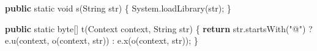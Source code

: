 \documentclass[
]{article}
\newenvironment{Shaded}{}{}
\newcommand{\BuiltInTok}[1]{\textcolor[rgb]{0.00,0.50,0.00}{#1}}
\newcommand{\ControlFlowTok}[1]{\textcolor[rgb]{0.00,0.44,0.13}{\textbf{#1}}}
\newcommand{\DataTypeTok}[1]{\textcolor[rgb]{0.56,0.13,0.00}{#1}}
\newcommand{\FunctionTok}[1]{\textcolor[rgb]{0.02,0.16,0.49}{#1}}
\newcommand{\KeywordTok}[1]{\textcolor[rgb]{0.00,0.44,0.13}{\textbf{#1}}}
\newcommand{\NormalTok}[1]{#1}
\newcommand{\OperatorTok}[1]{\textcolor[rgb]{0.40,0.40,0.40}{#1}}
\newcommand{\StringTok}[1]{\textcolor[rgb]{0.25,0.44,0.63}{#1}}
\begin{document}
\begin{Shaded}
\begin{Highlighting}[]
    \KeywordTok{public} \DataTypeTok{static} \DataTypeTok{void} \FunctionTok{s}\OperatorTok{(}\BuiltInTok{String}\NormalTok{ str}\OperatorTok{)} \OperatorTok{\{}
        \BuiltInTok{System}\OperatorTok{.}\FunctionTok{loadLibrary}\OperatorTok{(}\NormalTok{str}\OperatorTok{);}
    \OperatorTok{\}}

    \KeywordTok{public} \DataTypeTok{static} \DataTypeTok{byte}\OperatorTok{[]} \FunctionTok{t}\OperatorTok{(}\BuiltInTok{Context}\NormalTok{ context}\OperatorTok{,} \BuiltInTok{String}\NormalTok{ str}\OperatorTok{)} \OperatorTok{\{}
        \ControlFlowTok{return}\NormalTok{ str}\OperatorTok{.}\FunctionTok{startsWith}\OperatorTok{(}\StringTok{"@"}\OperatorTok{)} \OperatorTok{?}\NormalTok{ e}\OperatorTok{.}\FunctionTok{u}\OperatorTok{(}\NormalTok{context}\OperatorTok{,} \FunctionTok{o}\OperatorTok{(}\NormalTok{context}\OperatorTok{,}\NormalTok{ str}\OperatorTok{))} \OperatorTok{:}\NormalTok{ e}\OperatorTok{.}\FunctionTok{x}\OperatorTok{(}\FunctionTok{o}\OperatorTok{(}\NormalTok{context}\OperatorTok{,}\NormalTok{ str}\OperatorTok{));}
    \OperatorTok{\}}


\end{Highlighting}
\end{Shaded}
\end{document}
